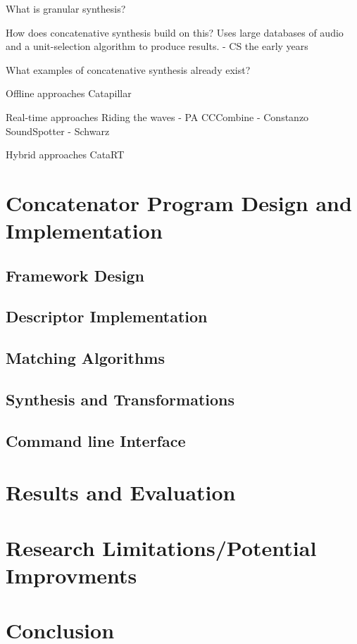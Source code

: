\documentclass{scrartcl}
\begin{document}
    What is granular synthesis?

    How does concatenative synthesis build on this?
    Uses large databases of audio and a unit-selection algorithm to produce results. - CS the early years
    
    What examples of concatenative synthesis already exist?

    Offline approaches
    Catapillar

    Real-time approaches
    Riding the waves - PA
    CCCombine - Constanzo
    SoundSpotter - Schwarz

    Hybrid approaches
    CataRT 


    \section*{Concatenator Program Design and Implementation}
    \subsection*{Framework Design}
    \subsection*{Descriptor Implementation}
    \subsection*{Matching Algorithms}
    \subsection*{Synthesis and Transformations}
    \subsection*{Command line Interface}

    \section*{Results and Evaluation}
    \section*{Research Limitations/Potential Improvments}
    \section*{Conclusion}
\end{document}
